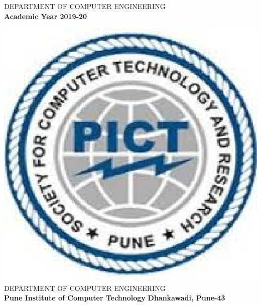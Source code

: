 \documentclass[a4paper, 12pt]{article}
\begin{document}
\begin{titlepage}
\begin{center}
        \Large
        DEPARTMENT OF COMPUTER ENGINEERING\\
		\textbf{Academic Year 2019-20}
        
    \end{center}
\end{titlepage}
\pagebreak
\begin{titlepage}
\begin{center}
	\includegraphics[scale=0.6]{pict} 
	\linebreak
	\Large
        DEPARTMENT OF COMPUTER ENGINEERING\\
        \textbf{Pune Institute of Computer Technology}
		\linebreak
		\textbf{Dhankawadi, Pune-43}
		\vspace{0.8cm}
		\Large
		

\end{center}
\end{titlepage}
\end{document}

